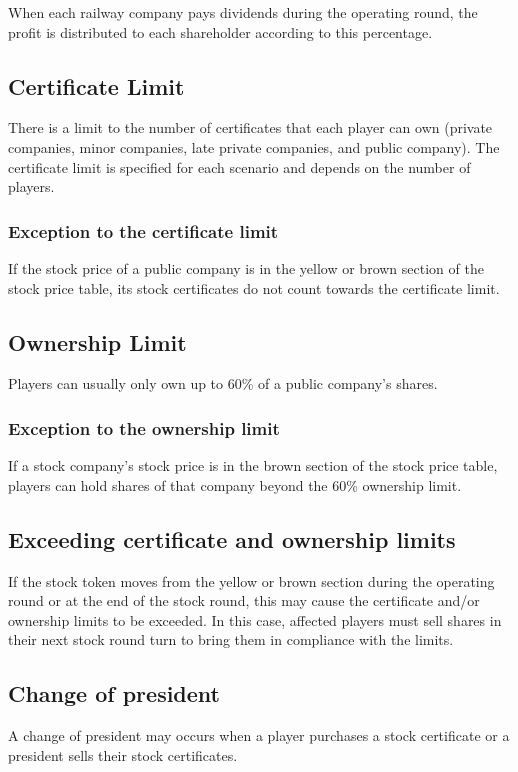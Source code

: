 \documentclass{article}
\begin{document}
\begin{CJK}{UTF8}{min}
\begin{multicols}{2}
When each railway company pays dividends during the operating round,
the profit is distributed to each shareholder according to this
percentage.

\subsection{Certificate Limit}
There is a limit to the number of certificates that each player can
own (private companies, minor companies, late private companies, and
public company). The certificate limit is specified for each scenario
and depends on the number of players.

\subsubsection{Exception to the certificate limit}
\label{sec:certificate-limit-exceptions}
If the stock price of a public company is in the yellow or brown
section of the stock price table, its stock certificates do not count
towards the certificate limit.

\subsection{Ownership Limit}
Players can usually only own up to 60\% of a public company's
shares.

\subsubsection{Exception to the ownership limit}
\label{sec:ownership-limit-exceptions}
If a stock company's stock price is in the brown section of the stock
price table, players can hold shares of that company beyond the 60\%
ownership limit.

\subsection{Exceeding certificate and ownership limits}
If the stock token moves from the yellow or brown section during the
operating round or at the end of the stock round, this may cause the
certificate and/or ownership limits to be exceeded. In this case,
affected players must sell shares in their next stock round turn to
bring them in compliance with the limits.

\subsection{Change of president}
A change of president may occurs when a player purchases a stock
certificate or a president sells their stock certificates.


\end{multicols}
\end{CJK}
\end{document}
